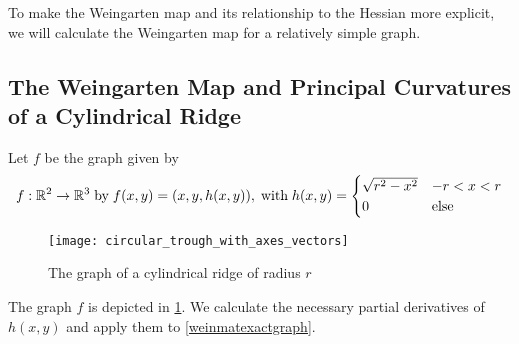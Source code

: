 %
%
%

  
  To make the Weingarten map and its relationship to the Hessian more explicit, we will calculate the Weingarten map for a relatively simple graph.
  
  \subsection{The Weingarten Map and Principal Curvatures of a Cylindrical Ridge} \label{sec:calculate-weinmap-of-a-ridge}
  
  Let $f$ be the graph given by 
  \begin{equation}
   f: \mathbb{R}^2 \to \mathbb{R}^3 \;\textrm{by}\; f(x,y) = (x,y,h(x,y)), \;\textrm{with}\;
   h(x,y) = \begin{cases}
    \sqrt{r^2 - x^2} & -r < x < r \\
    0 & \textrm{else}
    \end{cases}
  \end{equation} 
  \begin{figure}[t]
  \texttt{[image: circular\_trough\_with\_axes\_vectors]}
  \caption{The graph of a cylindrical ridge of radius $r$}
  \label{fig:ridge-graph}
  \end{figure}
  
  The graph $f$ is depicted in \cref{fig:ridge-graph}. We calculate the necessary partial derivatives of $h(x,y)$ and apply them to \cref{weinmatexactgraph}.
  
